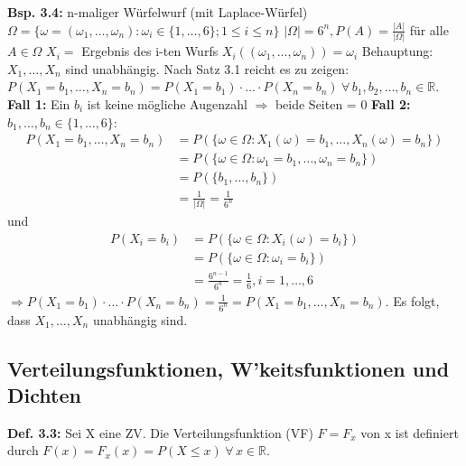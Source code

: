 \documentclass[a4paper,11pt]{article}
\begin{document}
\vspace{6pt}
\noindent\textbf{Bsp. 3.4:} n-maliger Würfelwurf (mit Laplace-Würfel)
\newline $\Omega=\{\omega=(\omega_1,\dots,\omega_n): \omega_i\in\{1,\dots,6\}; 1\leq i\leq n\}$
\newline $|\Omega| = 6^n, P(A)= \frac{|A|}{|\Omega|}$ für alle $A\in\Omega$
\newline $X_i=$ Ergebnis des i-ten Wurfs
\newline $X_i((\omega_1,\dots,\omega_n))=\omega_i$
\newline Behauptung: $X_1,\dots,X_n$ sind unabhängig. Nach Satz 3.1 reicht es zu zeigen:
\newline $P(X_1=b_1,\dots,X_n=b_n)=P(X_1=b_1)\cdot\dots\cdot P(X_n=b_n) \hspace{3pt}\forall \hspace{2pt}b_1,b_2,\dots,b_n\in\mathbb{R}$.
\vspace{4pt}
\newline\textbf{Fall 1:} Ein $b_i$ ist keine mögliche Augenzahl $\Rightarrow$ beide Seiten = 0
\newline\textbf{Fall 2:} $b_1,\dots,b_n\in\{1,\dots,6\}$:
\begin{align*}
P(X_1=b_1,\dots,X_n=b_n) &= P(\{\omega\in\Omega: X_1(\omega)=b_1,\dots,X_n(\omega)=b_n\})\\
&= P(\{\omega\in\Omega: \omega_1=b_1,\dots,\omega_n=b_n\})\\
&= P(\{b_1,\dots,b_n\})\\
&= \frac{1}{|\Omega|} = \frac{1}{6^n}
\end{align*}
und 
\begin{align*}
P(X_i=b_i) &= P(\{\omega\in\Omega:X_i(\omega)=b_i\})\\
&= P(\{\omega\in\Omega:\omega_i=b_i\})\\
&= \frac{6^{n-1}}{6^n}=\frac{1}{6}, i=1,\dots,6
\end{align*}
$\Rightarrow P(X_1=b_1)\cdot\dots\cdot P(X_n=b_n)=\frac{1}{6^n}=P(X_1=b_1,\dots,X_n=b_n)$. 
\newline Es folgt, dass $X_1,\dots,X_n$ unabhängig sind.

\subsection{Verteilungsfunktionen, W'keitsfunktionen und Dichten}

\noindent\textbf{Def. 3.3:} Sei X eine ZV. 
Die Verteilungsfunktion (VF) $F=F_x$ von x ist definiert durch $F(x)=F_x(x)=P(X\leq x) \hspace{3pt}\forall\hspace{2pt} x\in\mathbb{R}$.
\end{document}
